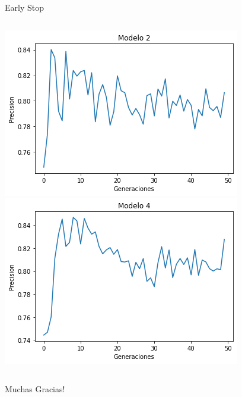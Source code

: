 \documentclass{beamer}
\begin{document}
\begin{frame}{Early Stop}
\begin{columns}
    \includegraphics[width=\columnwidth]{Imagenes/AG2.png}
    \includegraphics[width=\columnwidth]{Imagenes/AG4.png}
    
    \end{columns}
\end{frame}

\begin{frame}
    Muchas Gracias!
\end{frame}
\end{document}
